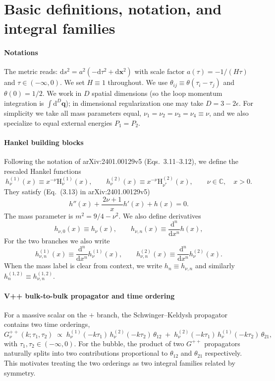\documentclass[a4paper,12pt]{article}
\newcommand{\FR}[2]{\displaystyle\frac{\,{#1}\,}{#2}}
\def\bge{\begin{equation}}
\def\ede{\end{equation}}
\def\di{{\mathrm{d}}}
\def\mb{\mathbf}
\def\ep{\epsilon}
\begin{document}
\section{Basic definitions, notation, and integral families}
\label{sec:definitions}
\paragraph{Notations} The metric reads: $\di s^2=a^2(-\di\tau^2+\di \mb x^2)$ with scale factor $a(\tau)=-1/(H\tau)$ and $\tau\in(-\infty,0)$. We set $H\equiv 1$ throughout. We use $\theta_{ij}\equiv\theta(\tau_i-\tau_j)$ and $\theta(0)=1/2$. We work in $D$ spatial dimensions (so the loop momentum integration is $\int\di^D\mb q$); in dimensional regularization one may take $D=3-2\ep$. For simplicity we take all mass parameters equal, $\nu_1=\nu_2=\nu_3=\nu_4\equiv\nu$, and we also specialize to equal external energies $P_1=P_2$.

\paragraph{Hankel building blocks} Following the notation of arXiv:2401.00129v5 (Eqs.~3.11--3.12), we define the rescaled Hankel functions
\bge
h_\nu^{(1)}(x) \equiv x^{-\nu}\mathrm H_{\nu}^{(1)}(x),\qquad h_\nu^{(2)}(x) \equiv x^{-\nu}\mathrm H_{\nu^*}^{(2)}(x),\qquad \nu\in\mathbb C,\quad x>0.
\ede
They satisfy (Eq.~(3.13) in arXiv:2401.00129v5)
\begin{equation}
	\label{eq:hdef}
	h''(x) + \FR{2\nu+1}{x}h'(x) + h(x) = 0.
\end{equation}
The mass parameter is $m^2=9/4-\nu^2$. We also define derivatives
\bge
h_{\nu,0}(x)\equiv h_\nu(x),\qquad h_{\nu,n} (x)  \equiv  \FR{\di^n}{\di x^n}h(x),
\ede
For the two branches we also write
\bge
h^{(1)}_{\nu,n}(x)\equiv \FR{\di^n}{\di x^n}h^{(1)}_\nu(x),\qquad
h^{(2)}_{\nu,n}(x)\equiv \FR{\di^n}{\di x^n}h^{(2)}_\nu(x).
\ede
When the mass label is clear from context, we write $h_n\equiv h_{\nu,n}$ and similarly $h^{(1,2)}_n\equiv h^{(1,2)}_{\nu,n}$.

\paragraph{V++ bulk-to-bulk propagator and time ordering} For a massive scalar on the $+$ branch, the Schwinger--Keldysh propagator contains two time orderings,
\bge
G^{++}_\nu(k;\tau_1,\tau_2)\;\propto\;
h_\nu^{(1)}(-k\tau_1)\,h_\nu^{(2)}(-k\tau_2)\,\theta_{12}
\;+\;
h_\nu^{(2)}(-k\tau_1)\,h_\nu^{(1)}(-k\tau_2)\,\theta_{21},
\ede
with $\tau_1,\tau_2\in(-\infty,0)$. For the bubble, the product of two $G^{++}$ propagators naturally splits into two contributions proportional to $\theta_{12}$ and $\theta_{21}$ respectively. This motivates treating the two orderings as two integral families related by symmetry.
\end{document}
